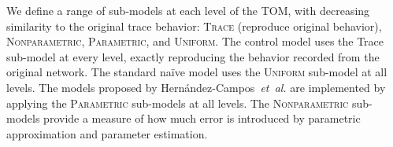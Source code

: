 \documentclass[conference]{IEEEtran}
\newcommand{\caps}[1]{{\small{#1}}}
\newcommand{\FHC}{Hern\'andez-Campos~\textit{et~al.}}
\newcommand{\class}[1]{\textsc{\small{#1}}}
\begin{document}
We define a range of sub-models at each level of the \caps{TOM}, with decreasing similarity to the original trace behavior: \class{Trace} (reproduce original behavior), \class{Nonparametric}, \class{Parametric}, and \class{Uniform}. The control model uses the Trace sub-model at every level, exactly reproducing the behavior recorded from the original network. The standard na\"ive model uses the \class{Uniform} sub-model at all levels. The models proposed by {\FHC} are implemented by applying the \class{Parametric} sub-models at all levels. The \class{Nonparametric} sub-models provide a measure of how much error is introduced by parametric approximation and parameter estimation.






\end{document}
